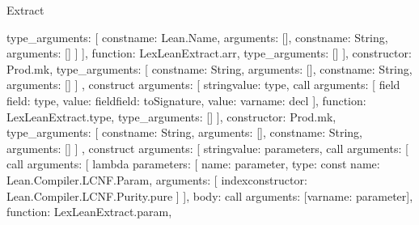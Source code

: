 \begin{lexlean}{Extract}
\begin{toolingmodule}
{{{{{{{{{{                                type_arguments: [
                                  const{name: Lean.Name, arguments: []},
                                  const{name: String, arguments: []}
                                ]
                              }
                            ],
                            function: LexLeanExtract.arr,
                            type_arguments: []
                          }
                        ],
                        constructor: Prod.mk,
                        type_arguments: [
                          const{name: String, arguments: []},
                          const{name: String, arguments: []}
                        ]
                      },
                      construct{
                        arguments: [
                          string{value: type},
                          call{
                            arguments: [
                              field{
                                field: type,
                                value: field{field: toSignature, value: var{name: decl}}
                              }
                            ],
                            function: LexLeanExtract.type,
                            type_arguments: []
                          }
                        ],
                        constructor: Prod.mk,
                        type_arguments: [
                          const{name: String, arguments: []},
                          const{name: String, arguments: []}
                        ]
                      },
                      construct{
                        arguments: [
                          string{value: parameters},
                          call{
                            arguments: [
                              call{
                                arguments: [
                                  lambda{
                                    parameters: [
                                      {
                                        name: parameter,
                                        type: const{
                                          name: Lean.Compiler.LCNF.Param,
                                          arguments: [
                                            index{constructor: Lean.Compiler.LCNF.Purity.pure}
                                          ]
                                        }
                                      }
                                    ],
                                    body: call{
                                      arguments: [var{name: parameter}],
                                      function: LexLeanExtract.param,
}}}}}}}}}}}}
\end{toolingmodule}
\end{lexlean}
